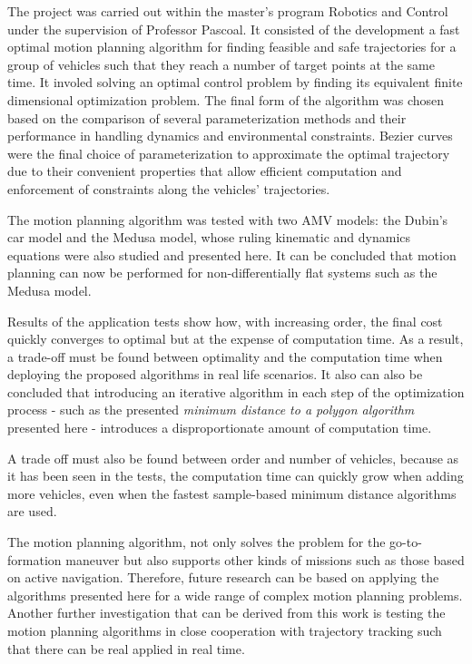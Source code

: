 \cleardoublepage%
\label{chap:conclusion}

\par The project was carried out within the master's program Robotics and Control under the supervision of Professor Pascoal. It consisted of the development a fast optimal motion planning algorithm for finding feasible and safe trajectories for a group of vehicles such that they reach a number of target points at the same time. It involed solving an optimal control problem by finding its equivalent finite dimensional optimization problem. The final form of the algorithm was chosen based on the comparison of several parameterization methods and their performance in handling dynamics and environmental constraints. Bezier curves were the final choice of parameterization to approximate the optimal trajectory due to their convenient properties that allow efficient computation and enforcement of constraints along the vehicles’ trajectories.



\par The motion planning algorithm was tested with two \ac{AMV} models: the Dubin's car model and the Medusa model, whose ruling kinematic and dynamics equations were also studied and presented here. It can be concluded that motion planning can now be performed for non-differentially flat systems such as the Medusa model.
\par Results of the application tests show how, with increasing order, the final cost quickly converges to optimal but at the expense of computation time. As a result, a trade-off must be found between optimality and the computation time when deploying the proposed algorithms in real life scenarios. It also can also be concluded that introducing an iterative algorithm in each step of the optimization process - such as the presented \textit{minimum distance to a polygon algorithm} presented here - introduces a disproportionate amount of computation time.
\par A trade off must also be found between order and number of vehicles, because as it has been seen in the tests, the computation time can quickly grow when adding more vehicles, even when the fastest sample-based minimum distance algorithms are used.
\par The motion planning algorithm, not only solves the problem for the go-to-formation maneuver but also supports other kinds of missions such as those based on active navigation. Therefore, future research can be based on applying the algorithms presented here for a wide range of complex motion planning problems. Another further investigation that can be derived from this work is testing the motion planning algorithms in close cooperation with trajectory tracking such that there can be real applied in real time.



